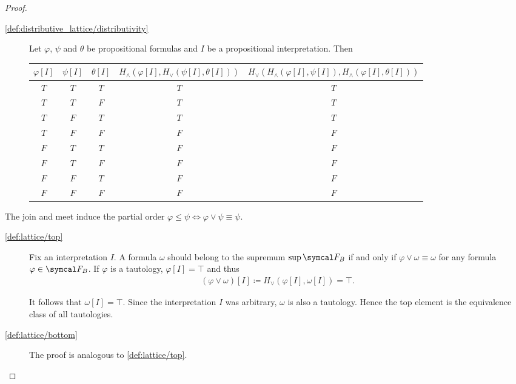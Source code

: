 \begin{proof}
\begin{description}
    \item[\ref{def:distributive_lattice/distributivity}] Let $\varphi$, $\psi$ and $\theta$ be propositional formulas and $I$ be a propositional interpretation. Then
    \begin{Center}
      \begin{tabular}{c c c | c | c}
        $\varphi[I]$ & $\psi[I]$ & $\theta[I]$ & \small{$H_\land(\varphi[I], H_\lor(\psi[I], \theta[I]))$} & \small{$H_\lor(H_\land(\varphi[I], \psi[I]), H_\land(\varphi[I], \theta[I]))$} \\
        \hline
        $T$          & $T$       & $T$         & $T$                                               & $T$    \\
        $T$          & $T$       & $F$         & $T$                                               & $T$    \\
        $T$          & $F$       & $T$         & $T$                                               & $T$    \\
        $T$          & $F$       & $F$         & $F$                                               & $F$    \\
        $F$          & $T$       & $T$         & $F$                                               & $F$    \\
        $F$          & $T$       & $F$         & $F$                                               & $F$    \\
        $F$          & $F$       & $T$         & $F$                                               & $F$    \\
        $F$          & $F$       & $F$         & $F$                                               & $F$
      \end{tabular}
    \end{Center}
  \end{description}

  The join and meet induce the partial order $\varphi \leq \psi \iff \varphi \lor \psi \equiv \psi$.

  \begin{description}
    \item[\ref{def:lattice/top}] Fix an interpretation $I$. A formula $\omega$ should belong to the supremum $\sup \Cal{F}_B$ if and only if $\varphi \lor \omega \equiv \omega$ for any formula $\varphi \in \Cal{F}_B$. If $\varphi$ is a tautology, $\varphi[I] = \top$ and thus
    \begin{align*}
      (\varphi \lor \omega)[I] \coloneqq H_\lor(\varphi[I], \omega[I]) = \top.
    \end{align*}

    It follows that $\omega[I] = \top$. Since the interpretation $I$ was arbitrary, $\omega$ is also a tautology. Hence the top element is the equivalence class of all tautologies.

    \item[\ref{def:lattice/bottom}] The proof is analogous to \ref{def:lattice/top}.
  \end{description}
\end{proof}

